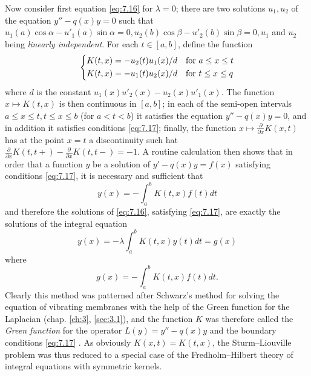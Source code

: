 \documentclass[12pt,a4paper,leqno,twoside]{extbook}
\newcommand{\pder}[2]{\frac{\partial #1}{\partial #2}}
\begin{document}
Now consider first equation \eqref{eq:7.16} for \(\lambda = 0\); there are two solutions \(u_1, u_2\) of the equation \(y''- q(x)y = 0\) such that \(u_1(a)\cos\alpha - u'_1(a)\sin\alpha = 0, u_2(b)\cos\beta - u'_2(b)\sin\beta = 0, u_1\) and \(u_2\) being \emph{linearly independent}. For each \(t \in [a,b]\), define the function
\begin{equation}
    \label{eq:7.18}
    \begin{dcases}
        K(t,x) = -u_2(t)u_1(x)/d & \text{for } a \leq x \leq t \\
        K(t,x) = -u_1(t)u_2(x)/d & \text{for } t \leq x \leq q
    \end{dcases}
\end{equation}
where \(d\) is the constant \(u_1(x)u'_2(x) - u_2(x)u'_1(x)\). The function \(x \mapsto K(t,x)\) is then continuous in \([a,b]\); in each of the semi-open intervals \(a \leq x \leq t, t \leq x \leq b\) (for \(a < t < b\)) it satisfies the equation \(y'' - q(x)y = 0\), and in addition it satisfies conditions \eqref{eq:7.17}; finally, the function \(x \mapsto \pder{}{x} K(x,t)\) has at the point \(x = t\) a discontinuity such hat \(\pder{}{x} K(t,t+) - \pder{}{x} K(t,t-) = -1\). A routine calculation then shows that in order that a function \(y\) be a solution of \(y'- q(x)y = f(x)\) satisfying conditions \eqref{eq:7.17}, it is necessary and sufficient that
\begin{equation}
    \label{eq:7.19}
    y(x) = -\int_a^b K(t,x)f(t)dt
\end{equation}
and therefore the solutions of \eqref{eq:7.16}, satisfying \eqref{eq:7.17}, are exactly the solutions of the integral equation
\begin{equation}
    \label{eq:7.20}
    y(x) = -\lambda \int_a^b K(t,x)y(t)dt = g(x)
\end{equation}
where
\begin{equation}
    \label{eq:7.21}
    g(x) = -\int_a^b K(t,x)f(t)dt.
\end{equation}
Clearly this method was patterned after Schwarz's method for solving the equation of vibrating membranes with the help of the Green function for the Laplacian (chap. \ref{ch:3}, \ref{sec:3.1}), and the function \(K\) was therefore called the \emph{Green function} for the operator \(L(y) = y'' - q(x)y\) and the boundary conditions \eqref{eq:7.17} \cite{035}. As obviously \(K(x,t) = K(t,x)\), the Sturm--Liouville problem was thus reduced to a special case of the Fredholm--Hilbert theory of integral equations with symmetric kernels.
\end{document}
